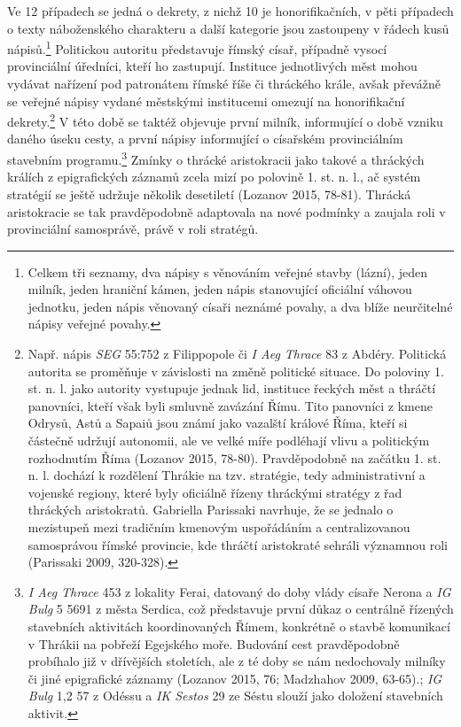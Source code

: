Ve 12 případech se jedná o dekrety, z nichž 10 je honorifikačních, v pěti případech o texty náboženského charakteru a další kategorie jsou zastoupeny v řádech kusů nápisů.\footnote{Celkem tři seznamy, dva nápisy s věnováním veřejné stavby (lázní), jeden milník, jeden hraniční kámen, jeden nápis stanovující oficiální váhovou jednotku, jeden nápis věnovaný císaři neznámé povahy, a dva blíže neurčitelné nápisy veřejné povahy.} Politickou autoritu představuje římský císař, případně vysocí provinciální úředníci, kteří ho zastupují. Instituce jednotlivých měst mohou vydávat nařízení pod patronátem římské říše či thráckého krále, avšak převážně se veřejné nápisy vydané městskými institucemi omezují na honorifikační dekrety.\footnote{Např. nápis {\em SEG} 55:752 z Filippopole či {\em I Aeg Thrace} 83 z Abdéry. Politická autorita se proměňuje v závislosti na změně politické situace. Do poloviny 1. st. n. l. jako autority vystupuje jednak lid, instituce řeckých měst a thráčtí panovníci, kteří však byli smluvně zavázání Římu. Tito panovníci z kmene Odrysů, Astů a Sapaiů jsou známí jako vazalští králové Říma, kteří si částečně udržují autonomii, ale ve velké míře podléhají vlivu a politickým rozhodnutím Říma (Lozanov 2015, 78-80). Pravděpodobně na začátku 1. st. n. l. dochází k rozdělení Thrákie na tzv. stratégie, tedy administrativní a vojenské regiony, které byly oficiálně řízeny thráckými stratégy z řad thráckých aristokratů. Gabriella Parissaki navrhuje, že se jednalo o mezistupeň mezi tradičním kmenovým uspořádáním a centralizovanou samosprávou římské provincie, kde thráčtí aristokraté sehráli významnou roli (Parissaki 2009, 320-328).} V této době se taktéž objevuje první milník, informující o době vzniku daného úseku cesty, a první nápisy informující o císařském provinciálním stavebním programu.\footnote{{\em I Aeg Thrace} 453 z lokality Ferai, datovaný do doby vlády císaře Nerona a {\em IG Bulg} 5 5691 z města Serdica, což představuje první důkaz o centrálně řízených stavebních aktivitách koordinovaných Římem, konkrétně o stavbě komunikací v Thrákii na pobřeží Egejského moře. Budování cest pravděpodobně probíhalo již v dřívějších stoletích, ale z té doby se nám nedochovaly milníky či jiné epigrafické záznamy (Lozanov 2015, 76; Madzhahov 2009, 63-65).; {\em IG Bulg} 1,2 57 z Odéssu a {\em IK Sestos} 29 ze Séstu slouží jako doložení stavebních aktivit.} Zmínky o thrácké aristokracii jako takové a thráckých králích z epigrafických záznamů zcela mizí po polovině 1. st. n. l., ač systém stratégií se ještě udržuje několik desetiletí (Lozanov 2015, 78-81). Thrácká aristokracie se tak pravděpodobně adaptovala na nové podmínky a zaujala roli v provinciální samosprávě, právě v roli stratégů.

